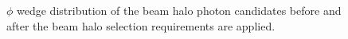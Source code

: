 \begin{figure}[htbm]
 \centering
\caption{$\phi$ wedge distribution of the beam halo photon candidates before and after the beam halo selection requirements are applied.}
 \label{fig:BHrej_PhoPhiWedge}
\end{figure}

